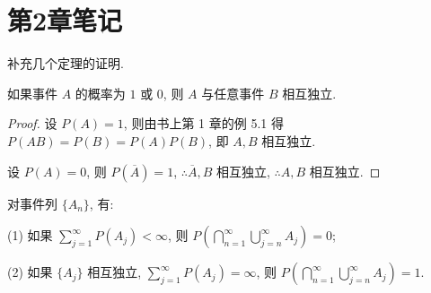\documentclass[color=black,device=normal,lang=cn]{elegantnote}
\numberwithin{equation}{section}
\theoremstyle{plain}
\numberwithin{exercise}{exsection}
\begin{document}
\section{第2章笔记}
补充几个定理的证明.
\begin{theorem}
    如果事件 $A$ 的概率为 $1$ 或 $0$, 则 $A$ 与任意事件 $B$ 相互独立.
\end{theorem}
\begin{proof}
    设 $P(A)=1$, 则由书上第 1 章的例 5.1 得 $P(AB)=P(B)=P(A)P(B)$, 即 $A,B$ 相互独立.

    设 $P(A)=0$, 则 $P(\overline{A})=1$, $\therefore\overline{A},B$ 相互独立, $\therefore A,B$ 相互独立.
\end{proof}
\begin{theorem}\label{t3.2}
    对事件列 $\{A_n\}$, 有:

    (1) 如果 $\sum\limits_{j=1}^\infty P(A_j)<\infty$, 则 $P\left(\bigcap\limits_{n=1}^\infty\bigcup\limits_{j=n}^\infty A_j\right)=0$;

    (2) 如果 $\{A_j\}$ 相互独立, $\sum\limits_{j=1}^\infty P(A_j)=\infty$, 则 $P\left(\bigcap\limits_{n=1}^\infty\bigcup\limits_{j=n}^\infty A_j\right)=1$.
\end{theorem}
\end{document}

